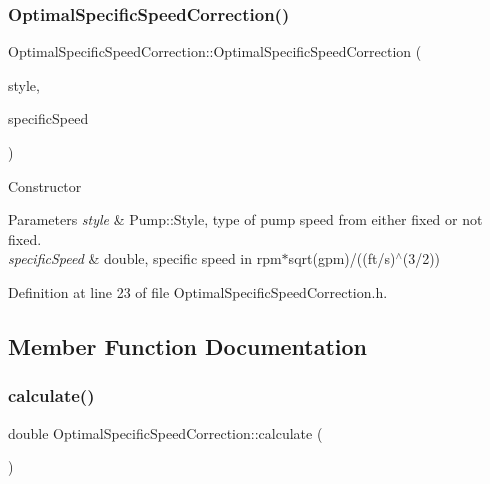 \subsubsection{\texorpdfstring{Optimal\+Specific\+Speed\+Correction()}{OptimalSpecificSpeedCorrection()}\hspace{0.1cm}{\footnotesize\ttfamily [3/3]}}
{\footnotesize\ttfamily Optimal\+Specific\+Speed\+Correction\+::\+Optimal\+Specific\+Speed\+Correction (\begin{DoxyParamCaption}\item[{const Pump\+::\+Style}]{style,  }\item[{const double}]{specific\+Speed }\end{DoxyParamCaption})\hspace{0.3cm}{\ttfamily [inline]}}

Constructor 
\begin{DoxyParams}{Parameters}
{\em style} & Pump\+::\+Style, type of pump speed from either fixed or not fixed. \\
\hline
{\em specific\+Speed} & double, specific speed in rpm$\ast$sqrt(gpm)/((ft/s)$^\wedge$(3/2)) \\
\hline
\end{DoxyParams}


Definition at line 23 of file Optimal\+Specific\+Speed\+Correction.\+h.



\subsection{Member Function Documentation}
\mbox{\label{class_optimal_specific_speed_correction_a3337ebde4e64c20f19adbda6204fa0be}} 
\subsubsection{\texorpdfstring{calculate()}{calculate()}\hspace{0.1cm}{\footnotesize\ttfamily [1/3]}}
{\footnotesize\ttfamily double Optimal\+Specific\+Speed\+Correction\+::calculate (\begin{DoxyParamCaption}{ }\end{DoxyParamCaption})}

